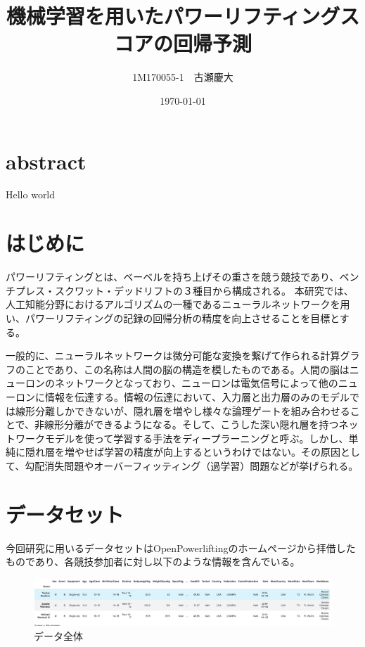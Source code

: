 \documentclass{article}
\title{機械学習を用いたパワーリフティングスコアの回帰予測}
\author{1M170055-1　古瀬慶大 }
\date{\today}
\begin{document}
\maketitle

\section{abstract}
Hello world




\section{はじめに}
パワーリフティングとは、ベーベルを持ち上げその重さを競う競技であり、ベンチプレス・スクワット・デッドリフトの３種目から構成される。
本研究では、人工知能分野におけるアルゴリズムの一種であるニューラルネットワークを用い、パワーリフティングの記録の回帰分析の精度を向上させることを目標とする。

一般的に、ニューラルネットワークは微分可能な変換を繋げて作られる計算グラフのことであり、この名称は人間の脳の構造を模したものである。人間の脳はニューロンのネットワークとなっており、ニューロンは電気信号によって他のニューロンに情報を伝達する。情報の伝達において、入力層と出力層のみのモデルでは線形分離しかできないが、隠れ層を増やし様々な論理ゲートを組み合わせることで、非線形分離ができるようになる。そして、こうした深い隠れ層を持つネットワークモデルを使って学習する手法をディープラーニングと呼ぶ。しかし、単純に隠れ層を増やせば学習の精度が向上するというわけではない。その原因として、勾配消失問題やオーバーフィッティング（過学習）問題などが挙げられる。


\section{データセット}

今回研究に用いるデータセットはOpenPowerliftingのホームページから拝借したものであり、各競技参加者に対し以下のような情報を含んでいる。

\begin{figure}[H]
\begin{center}
\includegraphics[width=\linewidth]{data_head.png}
\caption{データ全体}
\end{center}
\end{figure}
\end{document}
